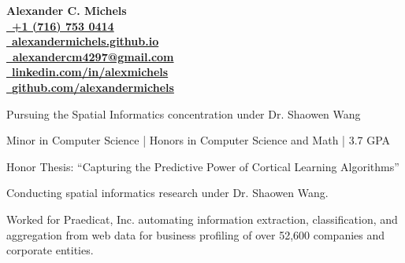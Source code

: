 \documentclass{acmresume}
\begin{document}
	
	\begin{multicols}{2}
		\vspace*{.15cm}
		\textbf{\Huge Alexander C. Michels} \\
		\columnbreak
		\hfill\href{tel:17167530414}{\faPhone~\textbf{+1 (716) 753 0414}} \\
		\hfill\href{http://alexandermichels.github.io}{\faGlobeAmericas~\textbf{alexandermichels.github.io}} \\
		\hfill\href{mailto:alexandercm4297@gmail.com}{\textbf{\faEnvelope~alexandercm4297@gmail.com}} \\ \hfill\href{https://www.linkedin.com/in/alexmichels/}{\faLinkedin~\textbf{linkedin.com/in/alexmichels}} \\
		\hfill\href{https://github.com/alexandermichels}{\faGithub~\textbf{github.com/alexandermichels}}
	\end{multicols}
	
	
		\begin{titemize}
			\item{Pursuing the Spatial Informatics concentration under Dr. Shaowen Wang}
		\end{titemize}

		\begin{titemize}
			\item{Minor in Computer Science | Honors in Computer Science and Math | 3.7 GPA}
            \item Honor Thesis: ``Capturing the Predictive Power of Cortical Learning Algorithms''
		\end{titemize}
	
	
        \begin{titemize}
            \item Conducting spatial informatics research under Dr. Shaowen Wang.
        \end{titemize}
	
        \begin{titemize}
            \item{Worked for Praedicat, Inc. automating information extraction, classification, and aggregation from web data for business profiling of over 52,600 companies and corporate entities.}
        \end{titemize}
    
\end{document}
